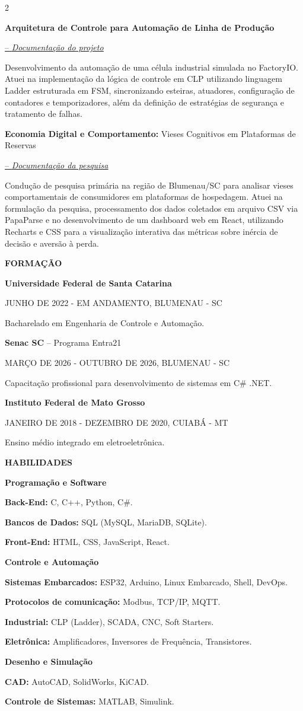 \documentclass[10pt,a4paper]{article}
\newcommand{\titulo}[1]{
    \vspace{7pt}%
    {\noindent\sffamily\bfseries\fontsize{10pt}{10pt}\selectfont\textcolor{HeadingBlue}{#1}\par}
}
\newcommand{\subtitulo}[2]{
  \vspace{7pt}%
  {\noindent\rmfamily\fontsize{11pt}{12pt}\selectfont\textcolor{TitleBlack}{\textbf{#1}\textnormal{ #2}}\par}%
}
\newcommand{\data}[1]{
  \vspace{5pt}
  {\noindent\sffamily\fontsize{8pt}{9pt}\selectfont\textcolor{BodyGrey}{#1}\par}%
}
\newcommand{\textonormal}[2]{
  \vspace{5pt}%
  {\noindent\rmfamily\fontsize{9pt}{12pt}\selectfont\textcolor{BodyGrey}{\textbf{#1} #2}\par}%
}
\newcommand{\projectlink}[2]{
  \href{#1}{-- \textcolor{LinkBlue}{\normalfont\itshape\fontsize{11pt}{12pt}\selectfont\uline{#2}}}\par
}
\newcommand{\cvsection}[1]{%
  \titulo{#1}%
}
\newcommand{\cvedu}[5]{%
  \subtitulo{#1}{#2}
  \data{#3}
  \textonormal{#4}{#5}
}
\newcommand{\cvproject}[5]{%
  \begingroup
  \let\par\relax %
  \subtitulo{#1}{#2}%
  \projectlink{#3}{#4}%
  \endgroup\par %
  \textonormal{}{#5}
}
\newcommand{\cvskillgroup}[1]{%
  \subtitulo{#1}{}
}
\newcommand{\cvskill}[2]{%
  \textonormal{#1:}{#2}
}
\begin{document}
\begin{paracol}{2}
\cvproject{Arquitetura de Controle para Automação de Linha de Produção}{}{https://drive.google.com/drive/folders/1KUVhSGjqwdvy2c0Ng44Rv6noSsY3V96u?usp=sharing}{Documentação do projeto}{Desenvolvimento da automação de uma célula industrial simulada no FactoryIO. Atuei na implementação da lógica de controle em CLP utilizando linguagem Ladder estruturada em FSM, sincronizando esteiras, atuadores, configuração de contadores e temporizadores, além da definição de estratégias de segurança e tratamento de falhas.}

\cvproject{Economia Digital e Comportamento:}{Vieses Cognitivos em Plataformas de Reservas}{https://drive.google.com/drive/folders/1F2QMQNhS111xobrtduxpHqVYyy9-DDgK}{Documentação da pesquisa}{%
  Condução de pesquisa primária na região de Blumenau/SC para analisar vieses comportamentais de consumidores em plataformas de hospedagem. Atuei na formulação da pesquisa, processamento dos dados coletados em arquivo CSV via PapaParse e no desenvolvimento de um dashboard web em React, utilizando Recharts e CSS para a visualização interativa das métricas sobre inércia de decisão e aversão à perda.%
}

\switchcolumn

\cvsection{FORMAÇÃO}

\cvedu{Universidade Federal de Santa Catarina}{}{JUNHO DE 2022 - EM ANDAMENTO, BLUMENAU - SC}{}{%
  Bacharelado em Engenharia de Controle e Automação.%
}

\cvedu{Senac SC}{-- Programa Entra21}{MARÇO DE 2026 - OUTUBRO DE 2026, BLUMENAU - SC}{}{Capacitação profissional para desenvolvimento de sistemas em C\# .NET.}

\cvedu{Instituto Federal de Mato Grosso}{}{JANEIRO DE 2018 - DEZEMBRO DE 2020, CUIABÁ - MT}{}{%
  Ensino médio integrado em eletroeletrônica.%
}

\cvsection{HABILIDADES}

\cvskillgroup{Programação e Software}
\cvskill{Back-End}{C, C++, Python, C\#.}
\cvskill{Bancos de Dados}{SQL (MySQL, MariaDB, SQLite).}
\cvskill{Front-End}{HTML, CSS, JavaScript, React.}

\cvskillgroup{Controle e Automação}
\cvskill{Sistemas Embarcados}{ESP32, Arduino, Linux Embarcado, Shell, DevOps.}
\cvskill{Protocolos de comunicação}{Modbus, TCP/IP, MQTT.}
\cvskill{Industrial}{CLP (Ladder), SCADA, CNC, Soft Starters.}
\cvskill{Eletrônica}{Amplificadores, Inversores de Frequência, Transistores.}

\cvskillgroup{Desenho e Simulação}
\cvskill{CAD}{AutoCAD, SolidWorks, KiCAD.}
\cvskill{Controle de Sistemas}{MATLAB, Simulink.}


\end{paracol}
\end{document}
